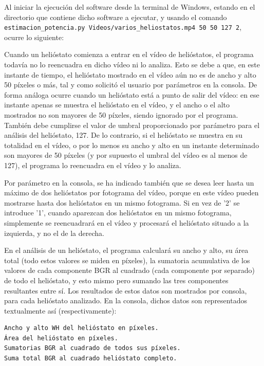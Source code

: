 Al iniciar la ejecución del software desde la terminal de Windows, estando en el directorio que contiene dicho software a ejecutar, y usando el comando \verb|estimacion_potencia.py Videos/varios_heliostatos.mp4 50 50 127 2|, ocurre lo siguiente:

Cuando un helióstato comienza a entrar en el vídeo de helióstatos, el programa todavía no lo reencuadra en dicho vídeo ni lo analiza. Esto se debe a que, en este instante de tiempo, el helióstato mostrado en el vídeo aún no es de ancho y alto 50 píxeles o más, tal y como solicitó el usuario por parámetros en la consola. De forma análoga ocurre cuando un helióstato está a punto de salir del vídeo: en ese instante apenas se muestra el helióstato en el vídeo, y el ancho o el alto mostrados no son mayores de 50 píxeles, siendo ignorado por el programa. También debe cumplirse el valor de umbral proporcionado por parámetro para el análisis del helióstato, 127. De lo contrario, si el helióstato se muestra en su totalidad en el vídeo, o por lo menos su ancho y alto en un instante determinado son mayores de 50 píxeles (y por supuesto el umbral del vídeo es al menos de 127), el programa lo reencuadra en el vídeo y lo analiza.

Por parámetro en la consola, se ha indicado también que se desea leer hasta un máximo de dos helióstatos por fotograma del vídeo, porque en este vídeo pueden mostrarse hasta dos helióstatos en un mismo fotograma. Si en vez de '2' se introduce '1', cuando aparezcan dos helióstatos en un mismo fotograma, simplemente se reencuadrará en el vídeo y procesará el helióstato situado a la izquierda, y no el de la derecha.

En el análisis de un helióstato, el programa calculará su ancho y alto, su área total (todo estos valores se miden en píxeles), la sumatoria acumulativa de los valores de cada componente BGR al cuadrado (cada componente por separado) de todo el helióstato, y esto mismo pero sumando las tres componentes resultantes entre sí. Los resultados de estos datos son mostrados por consola, para cada helióstato analizado. En la consola, dichos datos son representados textualmente así (respectivamente):

\begin{lstlisting}
Ancho y alto WH del helióstato en píxeles.
Área del helióstato en píxeles.
Sumatorias BGR al cuadrado de todos sus píxeles.
Suma total BGR al cuadrado helióstato completo.
\end{lstlisting}

